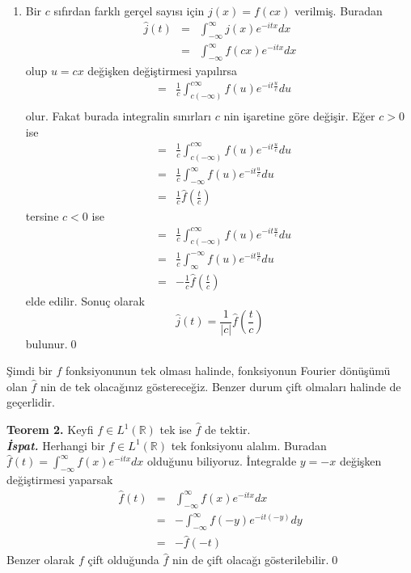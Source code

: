 \documentclass[a4paper, 9pt]{article}
\begin{document}
\begin{enumerate}
	\item Bir $c$ sıfırdan farklı gerçel sayısı için $j(x)=f(cx)$ verilmiş. Buradan
		\begin{eqnarray*}
		\widehat{j}(t)  &=&  \int_{-\infty }^{\infty } j(x) e^{-itx}dx  \\ 
		&=&  \int_{-\infty }^{\infty } f(cx) e^{-itx}dx
		\end{eqnarray*}
		olup $u=cx$ değişken değiştirmesi yapılırsa
		\begin{eqnarray*}
		&=& \frac{1}{c} \int_{c (-\infty) }^{c \infty } f(u)e^{-it\frac{u}{c}} du \\   
		\end{eqnarray*}
		olur. Fakat burada integralin sınırları $c$ nin işaretine göre değişir. Eğer $c>0$ ise
		\begin{eqnarray*}
		&=& \frac{1}{c} \int_{c (-\infty) }^{c \infty } f(u)e^{-it\frac{u}{c}} du \\   
		&=& \frac{1}{c} \int_{-\infty }^{\infty } f(u)e^{-it\frac{u}{c}} du \\  
		&=& \frac{1}{c} \widehat{f}(\frac{t}{c}) 
		\end{eqnarray*}
		tersine $c<0$ ise
		\begin{eqnarray*}
		&=& \frac{1}{c} \int_{c (-\infty) }^{c \infty } f(u)e^{-it\frac{u}{c}} du \\   
		&=& \frac{1}{c} \int_{\infty }^{-\infty } f(u)e^{-it\frac{u}{c}} du \\  
		&=& -\frac{1}{c} \widehat{f}(\frac{t}{c}) 
		\end{eqnarray*}
		elde edilir. Sonuç olarak
		$$ \widehat{j}(t) = \frac{1}{\left | c \right |} \widehat{f}(\frac{t}{c}) $$
		bulunur.\qed
\end{enumerate}

Şimdi bir $f$ fonksiyonunun tek olması halinde, fonksiyonun Fourier dönüşümü olan $\widehat{f}$ nin de tek olacağınız göstereceğiz. Benzer durum çift olmaları halinde de geçerlidir.

\textbf{Teorem 2.} Keyfi $f \in L^1(\mathbb{R})$ tek ise  $\widehat{f}$ de tektir.\\
\textit{\textbf{İspat.}} 
Herhangi bir $f \in L^1(\mathbb{R})$ tek fonksiyonu alalım. Buradan	$\widehat{f}(t) =  \int_{-\infty }^{\infty } f(x) e^{-itx}dx$ olduğunu biliyoruz. İntegralde $y=-x$ değişken değiştirmesi yaparsak  
	\begin{eqnarray*} 
		\widehat{f}(t) &=&  \int_{-\infty }^{\infty } f(x) e^{-itx}dx\\
		&=& - \int_{-\infty }^{ \infty } f(-y)e^{-it(-y)} dy \\   
		&=& -\widehat{f}(-t) 
	\end{eqnarray*}
Benzer olarak $f$ çift olduğunda $\widehat{f}$ nin de çift olacağı gösterilebilir.\qed
\end{document}
